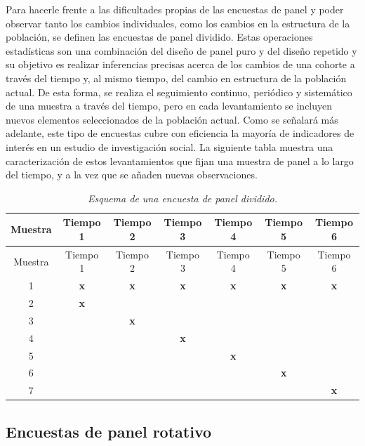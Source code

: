 \documentclass[
  10pt,
  spanish,
]{book}
\begin{document}
Para hacerle frente a las dificultades propias de las encuestas de panel y poder observar tanto los cambios individuales, como los cambios en la estructura de la población, se definen las encuestas de panel dividido. Estas operaciones estadísticas son una combinación del diseño de panel puro y del diseño repetido y su objetivo es realizar inferencias precisas acerca de los cambios de una cohorte a través del tiempo y, al mismo tiempo, del cambio en estructura de la población actual. De esta forma, se realiza el seguimiento continuo, periódico y sistemático de una muestra a través del tiempo, pero en cada levantamiento se incluyen nuevos elementos seleccionados de la población actual. Como se señalará más adelante, este tipo de encuestas cubre con eficiencia la mayoría de indicadores de interés en un estudio de investigación social. La siguiente tabla muestra una caracterización de estos levantamientos que fijan una muestra de panel a lo largo del tiempo, y a la vez que se añaden nuevas observaciones.

\begin{longtable}[]{@{}ccccccc@{}}
\caption{\emph{Esquema de una encuesta de panel dividido.}}\tabularnewline
\toprule
Muestra & Tiempo 1 & Tiempo 2 & Tiempo 3 & Tiempo 4 & Tiempo 5 & Tiempo 6 \\
\midrule
\endfirsthead
\toprule
Muestra & Tiempo 1 & Tiempo 2 & Tiempo 3 & Tiempo 4 & Tiempo 5 & Tiempo 6 \\
\midrule
\endhead
1 & \textbf{x} & \textbf{x} & \textbf{x} & \textbf{x} & \textbf{x} & \textbf{x} \\
2 & \textbf{x} & & & & & \\
3 & & \textbf{x} & & & & \\
4 & & & \textbf{x} & & & \\
5 & & & & \textbf{x} & & \\
6 & & & & & \textbf{x} & \\
7 & & & & & & \textbf{x} \\
\bottomrule
\end{longtable}

\hypertarget{encuestas-de-panel-rotativo}{%
\subsection{Encuestas de panel rotativo}\label{encuestas-de-panel-rotativo}}
\end{document}
